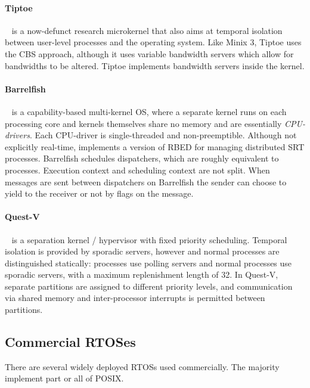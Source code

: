 \paragraph{Tiptoe}~\citep{Craciunas_KPRS_09} is a now-defunct research microkernel that also aims at
temporal isolation between user-level processes and the operating system.  Like {\sc Minix 3},
Tiptoe uses the \gls{CBS} approach, although it uses variable bandwidth servers which allow for
bandwidths to be altered.  Tiptoe implements bandwidth servers inside the kernel.

\paragraph{Barrelfish}~\citep{Peter_SBBIHR_10} is a capability-based multi-kernel \gls{OS}, where a separate kernel runs on each processing core and kernels themselves share no memory and are essentially \emph{\gls{CPU}-drivers}.
Each CPU-driver is single-threaded and non-preemptible. 
Although not explicitly real-time, implements a version of \gls{RBED} for managing distributed \gls{SRT} processes.
Barrelfish schedules dispatchers, which are roughly equivalent to processes. 
Execution context and scheduling context are not split.
When messages are sent between dispatchers on Barrelfish the sender can choose to yield to the receiver or not by flags on the message.

\paragraph{Quest-V}~\citep{Danish_LW_11} is a separation kernel / hypervisor with fixed priority
scheduling.  Temporal isolation is provided by sporadic servers, however \IO and normal processes
are distinguished statically: \IO processes use polling servers and normal processes use sporadic
servers, with a maximum replenishment length of 32. In Quest-V, separate partitions are assigned to
different priority levels, and communication via shared memory and inter-processor interrupts 
is permitted between partitions.

\subsection{Commercial RTOSes}
There are several widely deployed \glspl{RTOS} used commercially.  The majority implement part or
all of \gls{POSIX}.  

